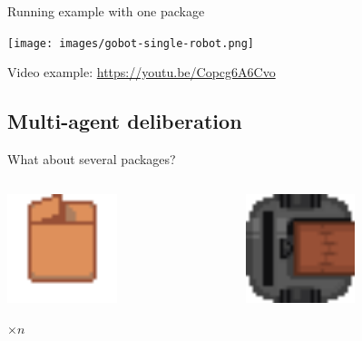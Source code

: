 \begin{frame}{Running example with one package}
    \centering

    \texttt{[image: images/gobot-single-robot.png]}
    
    \Large
    Video example: \href{https://youtu.be/Copcg6A6Cvo}{https://youtu.be/Copcg6A6Cvo}
\end{frame}

\subsection{Multi-agent deliberation}

\begin{frame}{What about several packages?}
    \begin{columns}
        \begin{column}{0.5\textwidth}
            \centering
            \includegraphics[width = 0.5\textwidth]{images/godot/package.png}
            
            \Large $\times n$
        \end{column}
        \begin{column}{0.5\textwidth}
            \centering
            \includegraphics[width = 0.5\textwidth]{images/godot/robot_texture.png}
            

\end{column}
\end{columns}
\end{frame}
